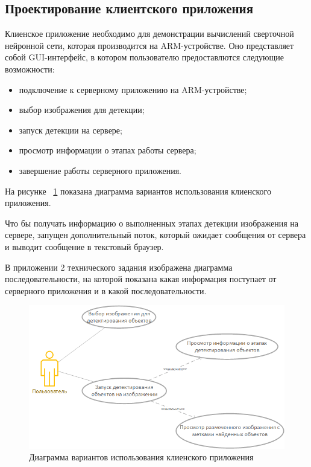 \documentclass[a4paper,english,russian]{G2-105}
\begin{document}
\subsection{Проектирование клиентского приложения} \ttl
\par Клиенское приложение необходимо для демонстрации вычислений сверточной нейронной сети, которая производится на ARM-устройстве. Оно представляет собой GUI-интерфейс, в котором пользователю предоставлются следующие возможности:
\begin{itemize}
\item подключение к серверному приложению на ARM-устройстве;
\item выбор изображения для детекции;
\item запуск детекции на сервере;
\item просмотр информации о этапах работы сервера;
\item завершение работы серверного приложения.
\end{itemize}
\par На рисунке ~\ref{usecase} показана диаграмма вариантов использования клиенского приложения.
\par Что бы получать информацию о выполненных этапах детекции изображения на сервере, запущен дополнительный поток, который ожидает сообщения от сервера и выводит сообщение в текстовый браузер. 
\par В приложении 2 технического задания изображена диаграмма последовательности, на которой показана какая информация поступает от серверного приложения и в какой последовательности. 
\begin{figure}
    \includegraphics[scale = 0.7]{usecaseclient.png}
    \caption{Диаграмма вариантов использования клиенского приложения}
	\label{usecase}
\end{figure}
\ttl
\end{document}

